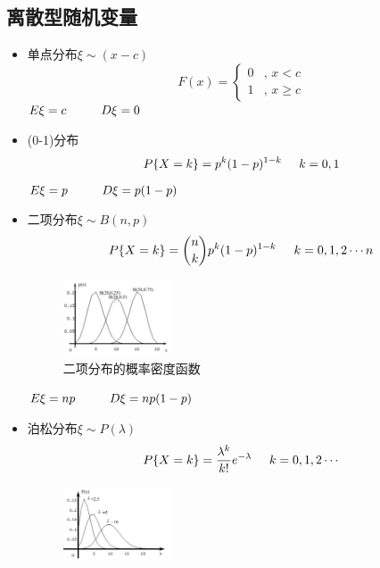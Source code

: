 \documentclass{article}
\begin{document}
\subsection*{离散型随机变量}
\begin{itemize}
    \item 单点分布\hspace*{0.5cm}$\xi \sim (x-c)$
    \[F(x)=\begin{cases}
            0& \text{, } x<c \\
            1& \text{, } x\geq c
           \end{cases}\]
    $E\xi =c \hspace*{1cm} D\xi =0$
    \item (0-1)分布\\
    \[P\{X=k\}=p^k(1-p)^{1-k}\hspace*{0.5cm}k=0,1\]
    $E\xi =p \hspace*{1cm} D\xi =p(1-p)$
    \item 二项分布\hspace*{0.5cm}$\xi\sim B (n,p)$
    \[P\{X=k\}=\binom{n}{k} p^k(1-p)^{1-k}\hspace*{0.5cm}k=0,1,2\cdots n\]
    \begin{figure}[H]
        \begin{center}
            \includegraphics[width=0.3\textwidth]{Bernoulli}
            \caption{二项分布的概率密度函数}
        \end{center}
    \end{figure}
    $E\xi =np \hspace*{1cm} D\xi =np(1-p)$
    \item 泊松分布\hspace*{0.5cm}$\xi\sim P (\lambda)$
    \[P\{X=k\}= \frac{\lambda ^k}{k!}e^{-\lambda} \hspace*{0.5cm}k=0,1,2\cdots \]
    \begin{figure}[H]
        \begin{center}
            \includegraphics[width=0.3\textwidth]{Poisson.png}

\end{center}
\end{figure}
\end{itemize}
\end{document}
